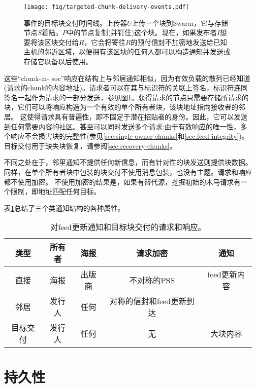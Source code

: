 \begin{figure}[htbp]
\centering
\texttt{[image: fig/targeted-chunk-delivery-events.pdf]}
\caption[事件的目标块交付时间\statusgreen]{事件的目标块交付时间线。上传器$U$上传一个块到Swarm，它与存储节点$S$着陆。$P$中的节点复制(并钉住)这个块。现在，如果发布者$I$想要将该区块交付给$R$，它会将寄往$R$的预付信封不加密地发送给已知主机的邻近区域，以便拥有该区块的任何人都可以构造通知并发送或存储它以备以后使用。}
\label{fig:targeted-chunk-delivery-events}
\end{figure}



这些“chunk-in- soc”响应在结构上与邻居通知相似，因为有效负载的散列已经知道(请求的chunk的内容地址)。请求者可以在其与标识符的关联上签名，标识符连同签名一起作为请求的一部分发送，参见图\ref{fig:targeted-chunk-delivery-events}。获得请求的节点只需要存储所请求的块，它们可以将响应构造为一个有效的单个所有者块，该块地址指向接收者的邻居。
这使得请求具有普遍性，即不固定于潜在招贴者的身份。因此，它可以发送到任何需要内容的社区。甚至可以同时发送多个请求:由于有效响应的唯一性，多个响应不会损害块的完整性(参见\ref{sec:single-owner-chunks}和\ref{sec:feed-integrity})。目标交付用于缺失块恢复，请参阅\ref{sec:recovery-chunks}。

不同之处在于，邻里通知不提供任何新信息，而有针对性的块发送则提供块数据。同样，在单个所有者块中包装的块交付不使用消息包装，也没有主题。请求和响应都不使用加密。
不使用加密的结果是，如果有替代源，挖掘初始的木马请求有一个限制，即地址匹配任何目标。

表\ref{tab:notifications}总结了三个类通知结构的各种属性。

\begin{table}[htpb]
    \centering
    \begin{tabular}{c c c c c | | | | |}
    类型&所有者&海报&请求加密&通知\\\hline
直接&海报&出版商&不对称的PSS & feed更新内容\\
邻居&发行人&任何&对称的信封和feed更新到达\\
目标交付&发行人&任何&无&大块内容\\
    \end{tabular}
    \caption[提要更新通知]{对feed更新通知和目标块交付的请求和响应。}
    \label{tab:notifications}
\end{table}

\chapter{持久性\statusgreen}\label{sec:persistence}


